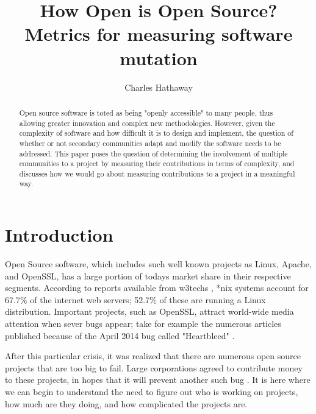 \documentclass[]{article}
\title{How Open is Open Source? Metrics for measuring software mutation}
\author{Charles Hathaway}
\begin{document}
\maketitle

\begin{abstract}

Open source software is toted as being "openly accessible" to many people, thus allowing greater innovation and complex new methodologies.
However, given the complexity of software and how difficult it is to design and implement, the question of whether or not secondary communities adapt and modify the software needs to be addressed.
This paper poses the question of determining the involvement of multiple communities to a project by measuring their contributions in terms of complexity, and discusses how we would go about measuring contributions to a project in a meaningful way.

\end{abstract}

\section{Introduction}


Open Source software, which includes such well known projects as Linux, Apache, and OpenSSL, has a large portion of todays market share in their respective segments.
According to reports available from w3techs \cite{w3techs2015usage}, *nix systems account for 67.7\% of the internet web servers; 52.7\% of these are running a Linux distribution. 
Important projects, such as OpenSSL, attract world-wide media attention when sever bugs appear; take for example the numerous articles published because of the April 2014 bug called "Heartbleed" \cite{mitre2013heartbleed}  \cite{whittaker2014heartbleed}.

After this particular crisis, it was realized that there are numerous open source projects that are too big to fail.
Large corporations agreed to contribute money to these projects, in hopes that it will prevent another such bug \cite{brodkin2014heartbleed}.
It is here where we can begin to understand the need to figure out who is working on projects, how much are they doing, and how complicated the projects are.
\end{document}
